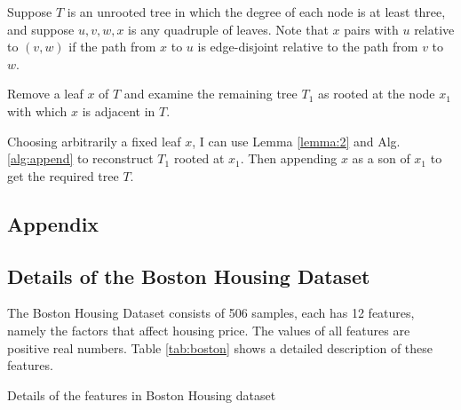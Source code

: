 \documentclass[12pt,a4paper]{article}
\theoremstyle{definition}
\begin{document}
Suppose $T$ is an unrooted tree in which the degree of each node is at least three, and suppose $u, v, w, x$ is any quadruple of leaves. Note that $x$ pairs with $u$ relative to $(v, w)$ if the path from $x$ to $u$ is edge-disjoint relative to the path from $v$ to $w$.

\vspace{0.008\linewidth}
Remove a leaf $x$ of $T$ and examine the remaining tree $T_1$ as rooted at the node $x_1$ with which $x$ is adjacent in $T$.

\vspace{0.008\linewidth}
Choosing arbitrarily a fixed leaf $x$, I can use Lemma \ref{lemma:2} and Alg. \ref{alg:append} to reconstruct $T_1$ rooted at $x_1$. Then appending $x$ as a son of $x_1$ to get the required tree $T$.

\newpage
\begin{appendix}
\section{Appendix}

\subsection{Details of the Boston Housing Dataset}
\label{apd:boston}

The Boston Housing Dataset consists of 506 samples, each has 12 features, namely the factors that affect housing price. The values of all features are positive real numbers. Table \ref{tab:boston} shows a detailed description of these features.

\begin{table}[H]
	\renewcommand\arraystretch{1.35}
	\caption{Details of the features in Boston Housing dataset}
	\label{tab:boston}
	\centering
	

\end{table}
\end{appendix}
\end{document}
